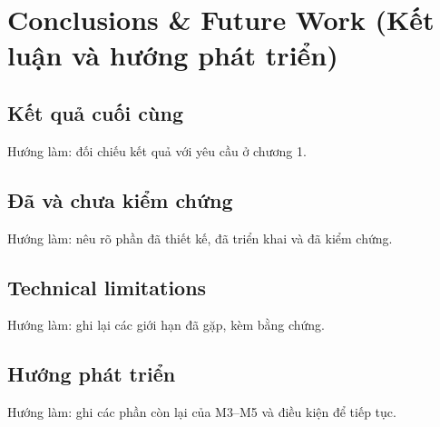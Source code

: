 \chapter{Conclusions \& Future Work (Kết luận và hướng phát triển)}

\section{Kết quả cuối cùng}

Hướng làm: đối chiếu kết quả với yêu cầu ở chương 1.

\section{Đã và chưa kiểm chứng}

Hướng làm: nêu rõ phần đã thiết kế, đã triển khai và đã kiểm chứng.

\section{Technical limitations}

Hướng làm: ghi lại các giới hạn đã gặp, kèm bằng chứng.

\section{Hướng phát triển}

Hướng làm: ghi các phần còn lại của M3--M5 và điều kiện để tiếp tục.
